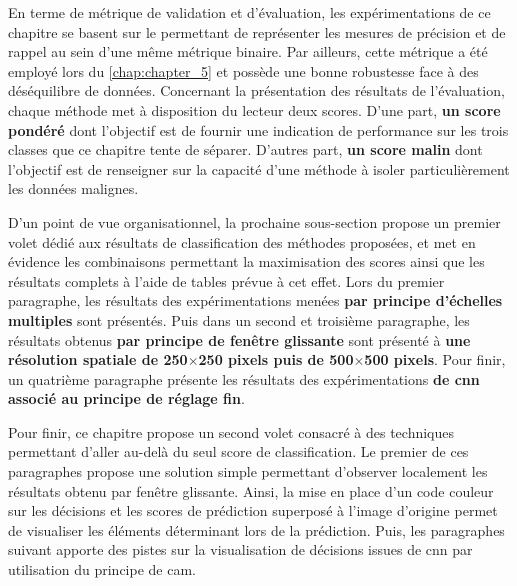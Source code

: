 En terme de métrique de validation et d'évaluation, les expérimentations de ce chapitre se basent sur le \textbf{\fscore{}} permettant de représenter les mesures de précision et de rappel au sein d'une même métrique binaire. Par ailleurs, cette métrique a été employé lors du \cref{chap:chapter_5} et possède une bonne robustesse face à des déséquilibre de données. Concernant la présentation des résultats de l'évaluation, chaque méthode met à disposition du lecteur deux scores. D'une part, \textbf{un score pondéré} dont l'objectif est de fournir une indication de performance sur les trois classes que ce chapitre tente de séparer. D'autres part, \textbf{un score malin} dont l'objectif est de renseigner sur la capacité d'une méthode à isoler particulièrement les données malignes.\par

D'un point de vue organisationnel, la prochaine sous-section propose un premier volet dédié aux résultats de classification des méthodes proposées, et met en évidence les combinaisons permettant la maximisation des scores ainsi que les résultats complets à l'aide de tables prévue à cet effet. Lors du premier paragraphe, les résultats des expérimentations menées \textbf{par principe d'échelles multiples} sont présentés. Puis dans un second et troisième paragraphe, les résultats obtenus \textbf{par principe de fenêtre glissante} sont présenté à \textbf{une résolution spatiale de 250$\times$250 pixels puis de 500$\times$500 pixels}. Pour finir, un quatrième paragraphe présente les résultats des expérimentations \textbf{de \gls{cnn} associé au principe de réglage fin}.\par

Pour finir, ce chapitre propose un second volet consacré à des techniques permettant d'aller au-delà du seul score de classification. Le premier de ces paragraphes propose une solution simple permettant d'observer localement les résultats obtenu par fenêtre glissante. Ainsi, la mise en place d'un code couleur sur les décisions et les scores de prédiction superposé à l'image d'origine permet de visualiser les éléments déterminant lors de la prédiction. Puis, les paragraphes suivant apporte des pistes sur la visualisation de décisions issues de \gls{cnn} par utilisation du principe de \gls{cam}.\par
\clearpage

